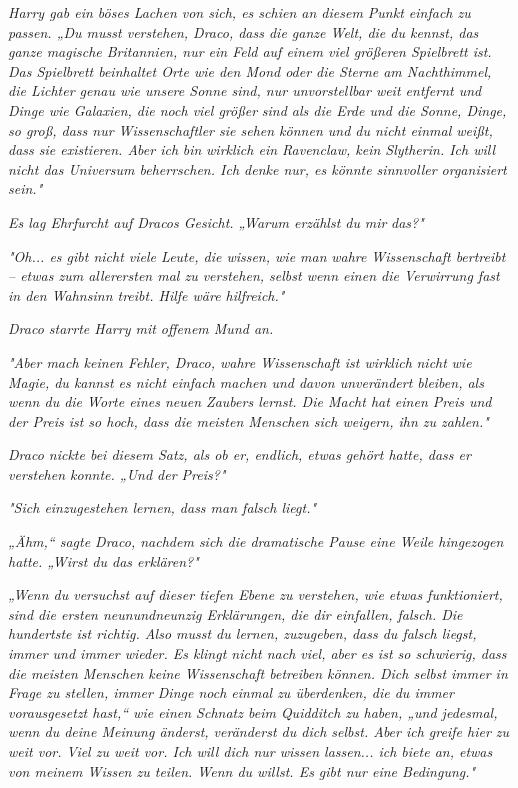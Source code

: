 {\emph{Harry gab ein böses Lachen von sich, es schien an diesem Punkt einfach zu passen. „Du musst verstehen, Draco, dass die ganze Welt, die du kennst, das ganze magische Britannien, nur ein Feld auf einem viel größeren Spielbrett ist. Das Spielbrett beinhaltet Orte wie den Mond oder die Sterne am Nachthimmel, die Lichter genau wie unsere Sonne sind, nur unvorstellbar weit entfernt und Dinge wie Galaxien, die noch viel größer} \emph{sind als die Erde und die Sonne, Dinge, so groß, dass nur Wissenschaftler sie sehen können und du nicht einmal weißt, dass sie existieren. Aber ich} \emph{\emph{bin}} \emph{wirklich ein Ravenclaw, kein Slytherin. Ich will nicht das Universum beherrschen. Ich denke nur, es könnte sinnvoller organisiert sein."}

\emph{Es lag Ehrfurcht auf Dracos Gesicht. „Warum erzählst du} \emph{\emph{mir}} \emph{das?"}

\emph{"Oh... es gibt nicht viele Leute, die wissen, wie man} \emph{\emph{wahre}} \emph{Wissenschaft bertreibt -- etwas zum allerersten mal zu verstehen, selbst wenn einen die Verwirrung fast in den Wahnsinn treibt. Hilfe wäre hilfreich."}

\emph{Draco starrte Harry mit offenem Mund an.}

\emph{"Aber mach keinen Fehler, Draco, wahre Wissenschaft ist wirklich} \emph{\emph{nicht}} \emph{wie Magie, du kannst es nicht einfach machen und davon unverändert bleiben, als wenn du die Worte eines neuen Zaubers lernst. Die Macht hat einen Preis und der Preis ist so hoch, dass die meisten Menschen sich weigern, ihn zu zahlen."}

\emph{Draco nickte bei diesem Satz, als ob er, endlich, etwas gehört hatte, dass er verstehen konnte. „Und der Preis?"}

\emph{"Sich einzugestehen lernen, dass man falsch liegt."}

\emph{„Ähm,“ sagte Draco, nachdem sich die dramatische Pause eine Weile hingezogen hatte. „Wirst du das erklären?"}

\emph{„Wenn du versuchst auf dieser tiefen Ebene zu verstehen, wie etwas funktioniert, sind die ersten neunundneunzig Erklärungen, die dir einfallen, falsch. Die hundertste ist richtig. Also musst du lernen, zuzugeben, dass du falsch liegst, immer und immer wieder. Es klingt nicht nach viel, aber es ist so schwierig, dass die meisten Menschen keine Wissenschaft betreiben können. Dich selbst immer in Frage zu stellen, immer Dinge noch einmal zu überdenken, die du immer vorausgesetzt hast,“ wie einen Schnatz beim Quidditch zu haben, „und jedesmal, wenn du deine Meinung änderst, veränderst du dich selbst. Aber ich greife hier zu weit vor. Viel zu weit vor. Ich will dich nur wissen lassen... ich biete an, etwas von meinem Wissen zu teilen. Wenn du willst. Es gibt nur eine Bedingung."}

}
